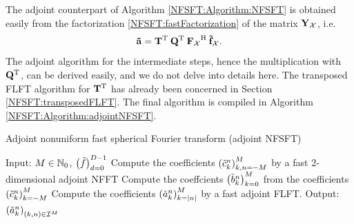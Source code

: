 The adjoint counterpart of Algorithm \ref{NFSFT:Algorithm:NFSFT} is obtained easily from the factorization 
\eqref{NFSFT:fastFactorization} of the matrix $\mathbf{Y}_{\mathcal{X}}$, i.e.
\[
  \mathbf{\tilde{a}} = \mathbf{T}^{\text{\rm{T}}} \: \mathbf{Q}^{\text{\rm{T}}} \: {\mathbf{F}_{\mathcal{X}}}^{\text{\rm{H}}} \: \mathbf{\tilde{f}}_{\mathcal{X}}.
\]
The adjoint algorithm for the intermediate steps, hence the multiplication with $\mathbf{Q}^{\text{\rm{T}}}$, can be derived easily, 
and we do not delve into details here. The transposed FLFT algorithm for $\mathbf{T}^{\text{\rm{T}}}$ has already been concerned 
in Section \ref{NFSFT:transposedFLFT}. The final algorithm is compiled in Algorithm \ref{NFSFT:Algorithm:adjointNFSFT}.

\begin{algorithm}[tb]
  \caption{Adjoint nonuniform fast spherical Fourier transform (adjoint NFSFT)}
  \label{NFSFT:Algorithm:adjointNFSFT}    
  \begin{algorithmic}
    \STATE Input:  $M \in \mathbb{N}_{0}$, $\left(\tilde{f}\right)_{d=0}^{D-1}$
    \STATE Compute the coefficients $\left(\tilde{c}_{k}^n\right)_{k,n=-M}^M$ by a fast 2-dimensional adjoint NFFT
      \STATE Compute the coeffcients $\left(\tilde{b}_{k}^n\right)_{k=0}^M$ from the coefficients $\left(\tilde{c}_{k}^n\right)_{k=-M}^{M}$ 
      \STATE Compute the coefficients $\left(\tilde{a}_{k}^n\right)_{k=|n|}^{M}$ by a fast adjoint FLFT.
    \ENDFOR
    \STATE Output: $\left(\tilde{a}_{k}^n\right)_{(k,n) \in \mathcal{I}^M}$
\end{algorithmic}
\end{algorithm}

